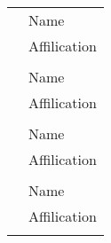 \begin{titlepage}
\begin{center}
\begin{table}[hb]
\begin{tabular}{ll}
    & Name\\ & Affilication   \\\\
    & Name\\ & Affilication    \\\\               
    & Name\\ & Affilication   \\\\               
    & Name\\ & Affilication    \\\\                               

    \end{tabular}
    \end{table}
        
    \end{center}
  \end{titlepage}